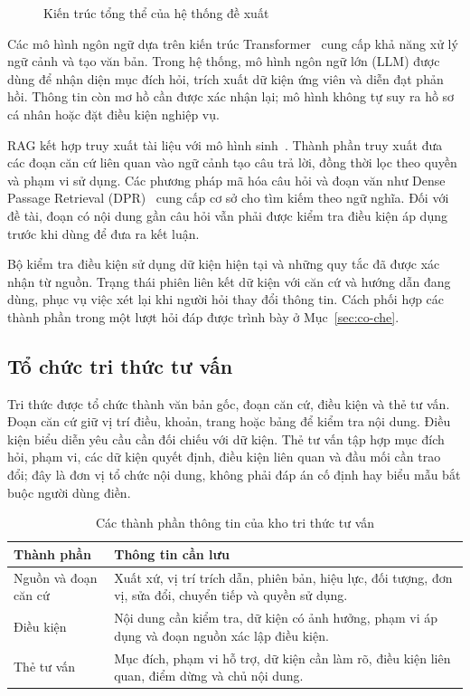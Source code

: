 \begin{figure}[H]
\centering
\caption{Kiến trúc tổng thể của hệ thống đề xuất}
\label{fig:kien-truc}
\end{figure}

Các mô hình ngôn ngữ dựa trên kiến trúc Transformer~\cite{vaswani2017attention}
cung cấp khả năng xử lý ngữ cảnh và tạo văn bản. Trong hệ thống, mô hình
ngôn ngữ lớn (LLM) được dùng để nhận diện mục đích hỏi, trích xuất dữ kiện
ứng viên và diễn đạt phản hồi. Thông tin còn mơ hồ cần được xác nhận lại;
mô hình không tự suy ra hồ sơ cá nhân hoặc đặt điều kiện nghiệp vụ.

RAG kết hợp truy xuất tài liệu với mô hình sinh~\cite{lewis2020rag}. Thành
phần truy xuất đưa các đoạn căn cứ liên quan vào ngữ cảnh tạo câu trả lời,
đồng thời lọc theo quyền và phạm vi sử dụng. Các phương pháp mã hóa câu hỏi
và đoạn văn như Dense Passage Retrieval (DPR)~\cite{karpukhin2020dpr} cung cấp cơ sở cho tìm kiếm theo
ngữ nghĩa. Đối với đề tài, đoạn có nội dung gần câu hỏi vẫn phải được kiểm
tra điều kiện áp dụng trước khi dùng để đưa ra kết luận.

Bộ kiểm tra điều kiện sử dụng dữ kiện hiện tại và những quy tắc đã được
xác nhận từ nguồn. Trạng thái phiên liên kết dữ kiện với căn cứ và hướng
dẫn đang dùng, phục vụ việc xét lại khi người hỏi thay đổi thông tin. Cách
phối hợp các thành phần trong một lượt hỏi đáp được trình bày ở
Mục~\ref{sec:co-che}.

\subsection{Tổ chức tri thức tư vấn}
\label{subsec:tri-thuc}
Tri thức được tổ chức thành văn bản gốc, đoạn căn cứ, điều kiện và thẻ tư
vấn. Đoạn căn cứ giữ vị trí điều, khoản, trang hoặc bảng để kiểm tra nội
dung. Điều kiện biểu diễn yêu cầu cần đối chiếu với dữ kiện. Thẻ tư vấn
tập hợp mục đích hỏi, phạm vi, các dữ kiện quyết định, điều kiện liên quan
và đầu mối cần trao đổi; đây là đơn vị tổ chức nội dung, không phải đáp án
cố định hay biểu mẫu bắt buộc người dùng điền.

\begin{table}[H]
\centering\small
\begin{tabularx}{\textwidth}{|P{30mm}|Y|}
\hline
\textbf{Thành phần} & \textbf{Thông tin cần lưu} \\\hline
Nguồn và đoạn căn cứ & Xuất xứ, vị trí trích dẫn, phiên bản, hiệu lực, đối tượng, đơn vị, sửa đổi, chuyển tiếp và quyền sử dụng. \\ \hline
Điều kiện & Nội dung cần kiểm tra, dữ kiện có ảnh hưởng, phạm vi áp dụng và đoạn nguồn xác lập điều kiện. \\ \hline
Thẻ tư vấn & Mục đích, phạm vi hỗ trợ, dữ kiện cần làm rõ, điều kiện liên quan, điểm dừng và chủ nội dung. \\
\hline
\end{tabularx}
\caption{Các thành phần thông tin của kho tri thức tư vấn}
\label{tab:du-lieu}
\end{table}

